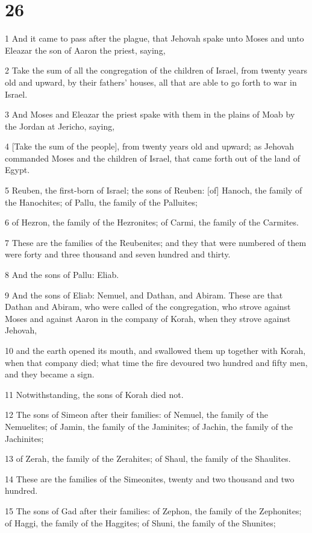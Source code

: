 \chapter{26}

\par 1 And it came to pass after the plague, that Jehovah spake unto Moses and unto Eleazar the son of Aaron the priest, saying,
\par 2 Take the sum of all the congregation of the children of Israel, from twenty years old and upward, by their fathers' houses, all that are able to go forth to war in Israel.
\par 3 And Moses and Eleazar the priest spake with them in the plains of Moab by the Jordan at Jericho, saying,
\par 4 [Take the sum of the people], from twenty years old and upward; as Jehovah commanded Moses and the children of Israel, that came forth out of the land of Egypt.
\par 5 Reuben, the first-born of Israel; the sons of Reuben: [of] Hanoch, the family of the Hanochites; of Pallu, the family of the Palluites;
\par 6 of Hezron, the family of the Hezronites; of Carmi, the family of the Carmites.
\par 7 These are the families of the Reubenites; and they that were numbered of them were forty and three thousand and seven hundred and thirty.
\par 8 And the sons of Pallu: Eliab.
\par 9 And the sons of Eliab: Nemuel, and Dathan, and Abiram. These are that Dathan and Abiram, who were called of the congregation, who strove against Moses and against Aaron in the company of Korah, when they strove against Jehovah,
\par 10 and the earth opened its mouth, and swallowed them up together with Korah, when that company died; what time the fire devoured two hundred and fifty men, and they became a sign.
\par 11 Notwithstanding, the sons of Korah died not.
\par 12 The sons of Simeon after their families: of Nemuel, the family of the Nemuelites; of Jamin, the family of the Jaminites; of Jachin, the family of the Jachinites;
\par 13 of Zerah, the family of the Zerahites; of Shaul, the family of the Shaulites.
\par 14 These are the families of the Simeonites, twenty and two thousand and two hundred.
\par 15 The sons of Gad after their families: of Zephon, the family of the Zephonites; of Haggi, the family of the Haggites; of Shuni, the family of the Shunites;
